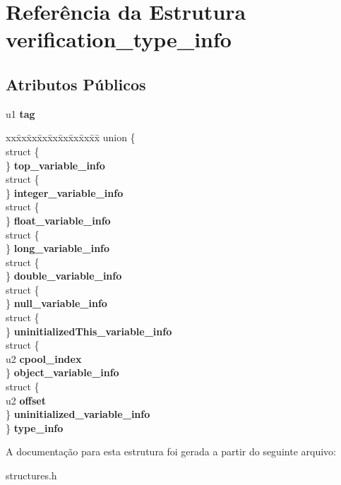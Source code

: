 \hypertarget{structverification__type__info}{}\section{Referência da Estrutura verification\+\_\+type\+\_\+info}
\label{structverification__type__info}
\subsection*{Atributos Públicos}
\begin{DoxyCompactItemize}
\item 
\mbox{\label{structverification__type__info_aeb9c72b398b4d3ce0863a916f973b05c}} 
u1 {\bfseries tag}
\item 
\mbox{\label{structverification__type__info_a694db81e19f00bd3af2cfa2fca4c81d2}} 
\begin{tabbing}
xx\=xx\=xx\=xx\=xx\=xx\=xx\=xx\=xx\=\kill
union \{\\
\>struct \{\\
\>\} {\bfseries top\_variable\_info}\\
\>struct \{\\
\>\} {\bfseries integer\_variable\_info}\\
\>struct \{\\
\>\} {\bfseries float\_variable\_info}\\
\>struct \{\\
\>\} {\bfseries long\_variable\_info}\\
\>struct \{\\
\>\} {\bfseries double\_variable\_info}\\
\>struct \{\\
\>\} {\bfseries null\_variable\_info}\\
\>struct \{\\
\>\} {\bfseries uninitializedThis\_variable\_info}\\
\>struct \{\\
\>\>u2 {\bfseries cpool\_index}\\
\>\} {\bfseries object\_variable\_info}\\
\>struct \{\\
\>\>u2 {\bfseries offset}\\
\>\} {\bfseries uninitialized\_variable\_info}\\
\} {\bfseries type\_info}\\

\end{tabbing}\end{DoxyCompactItemize}


A documentação para esta estrutura foi gerada a partir do seguinte arquivo\+:\begin{DoxyCompactItemize}
\item 
structures.\+h\end{DoxyCompactItemize}
